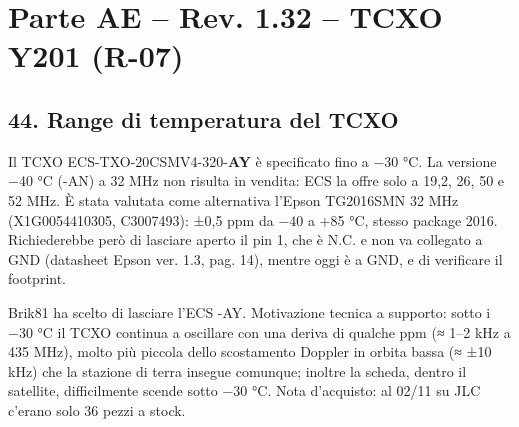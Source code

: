 \clearpage
\section[Parte AE – Rev. 1.32 – TCXO Y201 (R-07)]{Parte AE – Rev. 1.32 – TCXO Y201 (R-07)}

\subsection[44. Range di temperatura del TCXO]{44. Range di temperatura del TCXO}

Il TCXO ECS-TXO-20CSMV4-320-\textbf{AY} è specificato fino a −30 °C. La versione −40 °C (-AN) a 32 MHz non risulta in vendita: ECS la offre solo a 19,2, 26, 50 e 52 MHz. È stata valutata come alternativa l'Epson TG2016SMN 32 MHz (X1G0054410305, C3007493): ±0,5 ppm da −40 a +85 °C, stesso package 2016. Richiederebbe però di lasciare aperto il pin 1, che è N.C. e non va collegato a GND (datasheet Epson ver. 1.3, pag. 14), mentre oggi è a GND, e di verificare il footprint.

Brik81 ha scelto di lasciare l'ECS -AY. Motivazione tecnica a supporto: sotto i −30 °C il TCXO continua a oscillare con una deriva di qualche ppm (≈ 1–2 kHz a 435 MHz), molto più piccola dello scostamento Doppler in orbita bassa (≈ ±10 kHz) che la stazione di terra insegue comunque; inoltre la scheda, dentro il satellite, difficilmente scende sotto −30 °C. Nota d'acquisto: al 02/\allowbreak{}11 su JLC c'erano solo 36 pezzi a stock.
